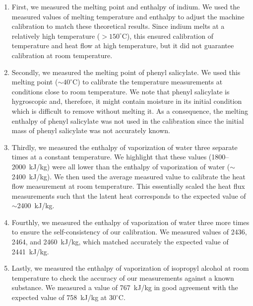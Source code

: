 \documentclass[11pt]{article}
\begin{document}
\begin{enumerate}
\item First, we measured the melting point and enthalpy of indium. We used the measured values of melting temperature and enthalpy to adjust the machine calibration to match these theoretical results. Since indium melts at a relatively high temperature ($>150^\circ$C), this ensured calibration of temperature and heat flow at high temperature, but it did not guarantee calibration at room temperature.\cite{rsc_indium}

\item Secondly, we measured the melting point of phenyl salicylate. We used this melting point ($\sim40^\circ$C) to calibrate the temperature measurements at conditions close to room temperature.\cite{pubchem_phenylsalicylate} We note that phenyl salicylate is hygroscopic and, therefore, it might contain moisture in its initial condition which is difficult to remove without melting it. As a consequence, the melting enthalpy of phenyl salicylate was not used in the calibration since the initial mass of phenyl salicylate was not accurately known.

\item Thirdly, we measured the enthalpy of vaporization of water three separate times at a constant temperature. We highlight that these values (1800--2000~kJ/kg) were all lower than the enthalpy of vaporization of water ($\sim$2400~kJ/kg). We then used the average measured value to calibrate the heat flow measurement at room temperature. This essentially scaled the heat flux measurements such that the latent heat corresponds to the expected value of $\sim$2400~kJ/kg.

\item Fourthly, we measured the enthalpy of vaporization of water three more times to ensure the self-consistency of our calibration. We measured values of 2436, 2464, and 2460~kJ/kg, which matched accurately the expected value of 2441~kJ/kg.

\item Lastly, we measured the enthalpy of vaporization of isopropyl alcohol at room temperature to check the accuracy of our measurements against a known substance. We measured a value of 767~kJ/kg in good agreement with the expected value of 758~kJ/kg at $30^\circ$C.\cite{nist_isopropanol}
\end{enumerate}
\end{document}
